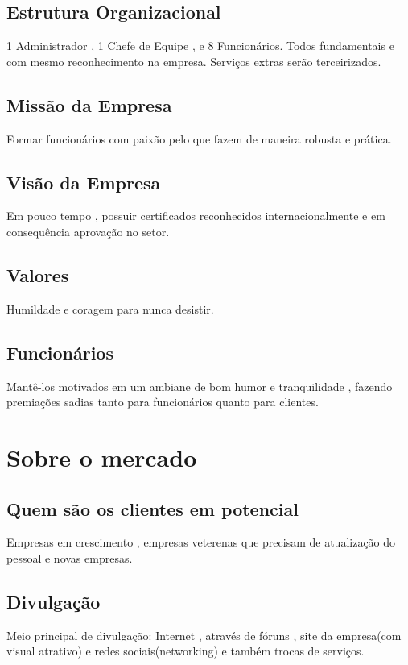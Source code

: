\documentclass[10pt]{article}
\begin{document}
\subsection{Estrutura Organizacional}
1 Administrador , 1 Chefe de Equipe , e 8 Funcionários. Todos fundamentais e com mesmo reconhecimento na empresa. Serviços extras serão terceirizados.

\subsection{Missão da Empresa}
Formar funcionários com paixão pelo que fazem de maneira robusta e prática.

\subsection{Visão da Empresa}
Em pouco tempo , possuir certificados reconhecidos internacionalmente e em consequência aprovação no setor.

\subsection{Valores}
Humildade e coragem para nunca desistir.

\subsection{Funcionários}
Mantê-los motivados em um ambiane de bom humor e tranquilidade , fazendo premiações sadias tanto para funcionários quanto para clientes.

\section{Sobre o mercado}

\subsection{Quem são os clientes em potencial}
Empresas em crescimento , empresas veterenas que precisam de atualização do pessoal e novas empresas.

\subsection{Divulgação}
Meio principal de divulgação: Internet , através de fóruns , site da empresa(com visual atrativo) e redes sociais(networking) e também trocas de serviços.
\end{document}
